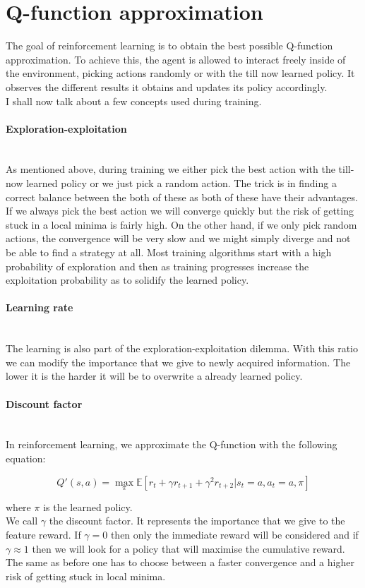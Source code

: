  \section{Q-function approximation} 
The goal of reinforcement learning is to obtain the best possible Q-function approximation. To achieve this, the agent is allowed to interact freely inside of the environment, picking actions randomly or with the till now learned policy. It observes the different results it obtains and updates its policy accordingly.\\ I shall now talk about a few concepts used during training.
\paragraph{Exploration-exploitation} \mbox{}\\
As mentioned above, during training we either pick the best action with the till-now learned policy or we just pick a random action. The trick is in finding a correct balance between the both of these as both of these have their advantages. If we always pick the best action we will converge quickly but the risk of getting stuck in a local minima is fairly high. On the other hand, if we only pick random actions, the convergence will be very slow and we might simply diverge and not be able to find a strategy at all. Most training algorithms start with a high probability of exploration and then as training progresses increase the exploitation probability as to solidify the learned policy.
\paragraph{Learning rate}\mbox{}\\
The learning is also part of the exploration-exploitation dilemma. With this ratio we can modify the importance that we give to newly acquired information. The lower it is the harder it will be to overwrite a already learned policy.

\paragraph{Discount factor}\mbox{}\\
In reinforcement learning, we approximate the Q-function with the following equation:
\begin{center}
\begin{equation}
	Q'(s,a) = \max_{\pi} \mathbb{E}[r_t+\gamma r_{t+1}+\gamma^2 r_{t+2}| s_t=a, a_t = a,\pi]
\end{equation}
\end{center}
where $\pi$ is the learned policy.\\
We call $\gamma$ the discount factor. It represents the importance that we give to the feature reward. If $\gamma = 0$ then only the immediate reward will be considered and if $\gamma \approx 1$ then we will look for a policy that will maximise the cumulative reward. The same as before one has to choose between a faster convergence and a higher risk of getting stuck in local minima.


